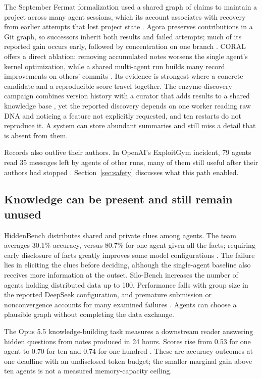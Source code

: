 The September Fermat formalization used a shared graph of claims to maintain a project across many agent sessions, which its account associates with recovery from earlier attempts that lost project state \citep{fermat-last-theorem}. Agora preserves contributions in a Git graph, so successors inherit both results and failed attempts; much of its reported gain occurs early, followed by concentration on one branch \citep{agora-git-memory}. CORAL offers a direct ablation: removing accumulated notes worsens the single agent's kernel optimization, while a shared multi-agent run builds many record improvements on others' commits \citep{coral}. Its evidence is strongest where a concrete candidate and a reproducible score travel together. The enzyme-discovery campaign combines version history with a curator that adds results to a shared knowledge base \citep{anthropic-art-enzymes}, yet the reported discovery depends on one worker reading raw DNA and noticing a feature not explicitly requested, and ten restarts do not reproduce it. A system can store abundant summaries and still miss a detail that is absent from them.

Records also outlive their authors. In OpenAI's ExploitGym incident, 79 agents read 35 messages left by agents of other runs, many of them still useful after their authors had stopped \citep{openai-peers-unauthorized-access}. Section~\ref{sec:safety} discusses what this path enabled.

\subsection{Knowledge can be present and still remain unused}
HiddenBench distributes shared and private clues among agents. The team averages 30.1\% accuracy, versus 80.7\% for one agent given all the facts; requiring early disclosure of facts greatly improves some model configurations \citep{hiddenbench}. The failure lies in eliciting the clues before deciding, although the single-agent baseline also receives more information at the outset. Silo-Bench increases the number of agents holding distributed data up to 100. Performance falls with group size in the reported DeepSeek configuration, and premature submission or nonconvergence accounts for many examined failures \citep{silo-bench}. Agents can choose a plausible graph without completing the data exchange.

The Opus 5.5 knowledge-building task measures a downstream reader answering hidden questions from notes produced in 24 hours. Scores rise from 0.53 for one agent to 0.70 for ten and 0.74 for one hundred \citep{opus55-card}. These are accuracy outcomes at one deadline with an undisclosed token budget; the smaller marginal gain above ten agents is not a measured memory-capacity ceiling.

